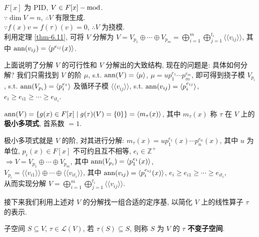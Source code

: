 \documentclass{note}
\begin{document}
$F[x]$ 为 PID, $V\in F[x]-\operatorname{mod}$.\\
$\because\dim V=n$, $\therefore V$ 有限生成.\\
$\because f(x)v=f(\tau)(v)=0$, $\therefore V$ 为挠模.\\
利用定理 \ref{thm-6.11}, 可将 $V$ 分解为 $V=V_{p_1}\oplus\cdots\oplus V_{p_m}=\bigoplus_{i=1}^m\bigoplus_{j=1}^{t_i}\langle\langle v_{ij}\rangle\rangle$, 其中 $\operatorname{ann}(v_{ij})=\langle p^{e_{ij}}(x)\rangle$.

上面说明了分解 $V$ 的可行性和 $V$ 分解出的大致结构, 现在的问题是: 具体如何分解? 我们只需找到 $V$ 的阶 $\mu$, s.t. $\operatorname{ann}(V)=\langle\mu\rangle$, $\mu=up_1^{e_1}\cdots p_m^{e_m}$, 即可得到挠子模 $V_{p_i}$, s.t. $\operatorname{ann}(V_{p_i})=\langle p_i^{e_1}\rangle$ 及循环子模 $\langle\langle v_{ij}\rangle\rangle$, s.t. $\operatorname{ann}(v_{ij})=\langle p_i^{e_{ij}}\rangle$, $e_i\geq e_{i1}\geq\cdots\geq e_{it_i}$.

\begin{df}[极小多项式]
    $\operatorname{ann}(V)=\{g(x)\in F[x]\mid g(\tau)(V)=\{0\}\}=\langle m_{\tau}(x)\rangle$, 其中 $m_{\tau}(x)$ 称 $\tau$ 在 $V$ 上的\textbf{极小多项式}, 首系数 $=1$.
\end{df}

极小多项式就是 $V$ 的阶, 对其进行分解: $m_{\tau}(x)=up_1^{e_1}(x)\cdots p_n^{e_n}(x)$, 其中 $u$ 为单位, $p_i(x)\in F[x]$ 不可约且互不相等, $e_i\in\mathbb{Z}^+$\\
$\Longrightarrow V=V_{p_1}\oplus\cdots\oplus V_{p_m}$, 其中 $\operatorname{ann}(V_{p_i})=\langle p_1^{e_1}(x)\rangle$,\\
$V_{p_i}=\langle\langle v_{i1}\rangle\rangle\oplus\cdots\oplus\langle\langle v_{it_i}\rangle\rangle$, 其中 $\operatorname{ann}(v_{ij})=\langle p_i^{e_{ij}}(x)\rangle$, $e_i\geq e_{i1}\geq\cdots\geq e_{it_i}$,\\
从而实现分解 $V=\bigoplus_{i=1}^m\bigoplus_{j=1}^{t_i}\langle\langle v_{ij}\rangle\rangle$.

接下来我们利用上述对 $V$ 的分解找一组合适的定序基, 以简化 $V$ 上的线性算子 $\tau$ 的表示.

\begin{df}[不变子空间]
    子空间 $S\subseteq V$, $\tau\in\mathcal{L}(V)$, 若 $\tau(S)\subseteq S$, 则称 $S$ 为 $V$ 的 $\tau$ \textbf{不变子空间}.
\end{df}
\end{document}
